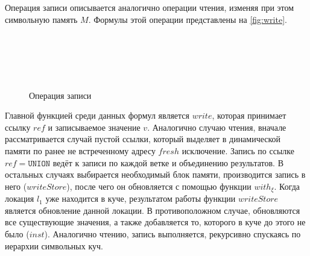 Операция записи описывается аналогично операции чтения, изменяя при этом символьную память $M$. Формулы этой операции представлены на \autoref{fig:write}.

\begin{figure}[H]
\centering
\tiny
\setlength{\jot}{1pt}
\begin{mymathbox}
 \\
 \\
 \\
 \\
\end{mymathbox}
\normalsize
\caption{Операция записи} \label{fig:write}
\end{figure}

Главной функцией среди данных формул является $\mathit{write}$, которая принимает ссылку $\mathit{ref}$ и записываемое значение $v$. Аналогично случаю чтения, вначале рассматривается случай пустой ссылки, который выделяет в динамической памяти по ранее не встреченному адресу $\mathit{fresh}$ исключение. Запись по ссылке $ref = \texttt{UNION}$ ведёт к записи по каждой ветке и объединению результатов. В остальных случаях выбирается необходимый блок памяти, производится запись в него ($writeStore$), после чего он обновляется с помощью функции $with_{\xi}$. Когда локация $l_1$ уже находится в куче, результатом работы функции $\mathit{writeStore}$ является обновление данной локации. В противоположном случае, обновляются все существующие значения, а также добавляется то, которого в куче до этого не было ($inst$). Аналогично чтению, запись выполняется, рекурсивно спускаясь по иерархии символьных куч.

